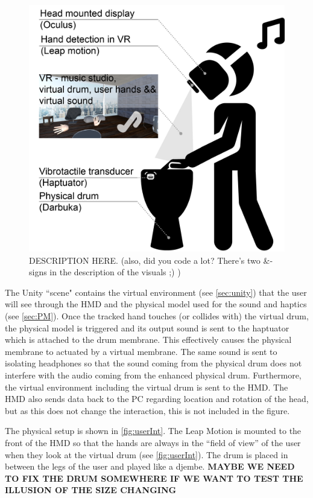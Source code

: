 \documentclass{vgtc}
\begin{document}
\begin{figure}[h]
\includegraphics[width=1.0\columnwidth]{VRDrumSetup.png}
\caption{DESCRIPTION HERE. (also, did you code a lot? There's two \&-signs in the description of the visuals ;) )}
\centering
\label{fig:systemLayout}
\end{figure}

The Unity ``scene" contains the virtual environment (see \autoref{sec:unity}) that the user will see through the HMD and the physical model used for the sound and haptics (see \autoref{sec:PM}). Once the tracked hand touches (or collides with) the virtual drum, the physical model is triggered and its output sound is sent to the haptuator which is attached to the drum membrane. This effectively causes the physical membrane to actuated by a virtual membrane. The same sound is sent to isolating headphones so that the sound coming from the physical drum does not interfere with the audio coming from the enhanced physical drum. Furthermore, the virtual environment including the virtual drum is sent to the HMD. The HMD also sends data back to the PC regarding location and rotation of the head, but as this does not change the interaction, this is not included in the figure. 

The physical setup is shown in \autoref{fig:userInt}. The Leap Motion is mounted to the front of the HMD so that the hands are always in the ``field of view'' of the user when they look at the virtual drum (see \autoref{fig:userInt}). The drum is placed in between the legs of the user and played like a djembe. \textbf{MAYBE WE NEED TO FIX THE DRUM SOMEWHERE IF WE WANT TO TEST THE ILLUSION OF THE SIZE CHANGING}
\end{document}
